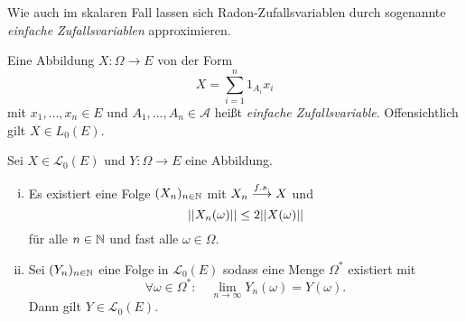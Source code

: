 Wie auch im skalaren Fall lassen sich Radon-Zufallsvariablen durch sogenannte \textit{einfache Zufallsvariablen} approximieren. 

\begin{mydef}
    Eine Abbildung $X:\Omega \to E$ von der Form 
    $$
        X = \sum_{i=1}^n 1_{A_i}x_i
    $$
    mit $x_1,...,x_n \in E$ und $A_1,..., A_n \in \mathcal{A}$ heißt \textit{einfache Zufallsvariable}. Offensichtlich gilt $X \in L_0(E)$. 
\end{mydef}


\begin{proposition}
    Sei $X \in \mathcal{L}_0(E)$ und $Y: \Omega \to E$ eine Abbildung. 
    \begin{enumerate}[(i)]
        \item Es existiert eine Folge $(X_n)_{n \in \mathbb{N}}$ mit $X_n \overset{f.s.}{\longrightarrow} X$ und 
        $$
            \lvert\lvert X_n(\omega) \rvert\rvert \leq 2 \lvert\lvert X(\omega) \rvert\rvert
        $$
        für alle $n \in \mathbb{N}$ und fast alle $\omega \in \Omega$. 
        \item Sei $(Y_n)_{n \in \mathbb{N}}$ eine Folge in $\mathcal{L}_0(E)$ sodass eine Menge $\Omega^*$ existiert mit 
        $$
            \forall \omega \in \Omega^*: \quad \lim_{n \to \infty}Y_n(\omega) = Y(\omega). 
        $$
        Dann gilt $Y \in \mathcal{L}_0(E)$. 
    \end{enumerate}
\end{proposition}

